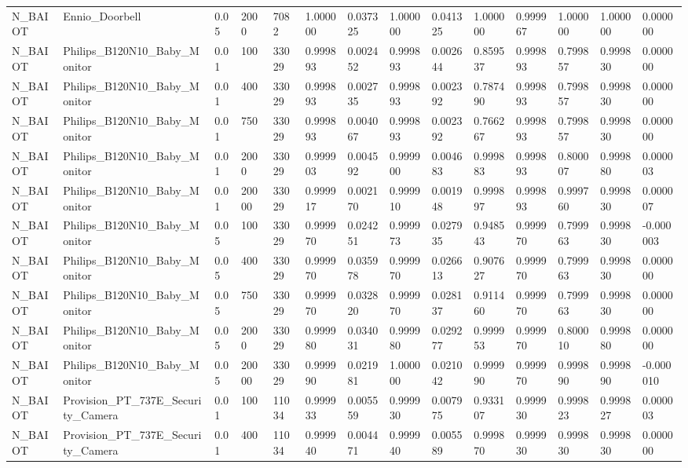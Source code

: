 \begin{tabular}{llllllllllllll}
N\_BAIOT & Ennio\_Doorbell & 0.05 & 2000 & 7082 & 1.000000 & 0.037325 & 1.000000 & 0.041325 & 1.000000 & 0.999967 & 1.000000 & 1.000000 & 0.000000 \\
N\_BAIOT & Philips\_B120N10\_Baby\_Monitor & 0.01 & 100 & 33029 & 0.999893 & 0.002452 & 0.999893 & 0.002644 & 0.859537 & 0.999893 & 0.799857 & 0.999830 & 0.000000 \\
N\_BAIOT & Philips\_B120N10\_Baby\_Monitor & 0.01 & 400 & 33029 & 0.999893 & 0.002735 & 0.999893 & 0.002392 & 0.787490 & 0.999893 & 0.799857 & 0.999830 & 0.000000 \\
N\_BAIOT & Philips\_B120N10\_Baby\_Monitor & 0.01 & 750 & 33029 & 0.999893 & 0.004067 & 0.999893 & 0.002392 & 0.766267 & 0.999893 & 0.799857 & 0.999830 & 0.000000 \\
N\_BAIOT & Philips\_B120N10\_Baby\_Monitor & 0.01 & 2000 & 33029 & 0.999903 & 0.004592 & 0.999900 & 0.004683 & 0.999883 & 0.999893 & 0.800007 & 0.999880 & 0.000003 \\
N\_BAIOT & Philips\_B120N10\_Baby\_Monitor & 0.01 & 20000 & 33029 & 0.999917 & 0.002170 & 0.999910 & 0.001948 & 0.999897 & 0.999893 & 0.999760 & 0.999830 & 0.000007 \\
N\_BAIOT & Philips\_B120N10\_Baby\_Monitor & 0.05 & 100 & 33029 & 0.999970 & 0.024251 & 0.999973 & 0.027935 & 0.948543 & 0.999970 & 0.799963 & 0.999830 & -0.000003 \\
N\_BAIOT & Philips\_B120N10\_Baby\_Monitor & 0.05 & 400 & 33029 & 0.999970 & 0.035978 & 0.999970 & 0.026613 & 0.907627 & 0.999970 & 0.799963 & 0.999830 & 0.000000 \\
N\_BAIOT & Philips\_B120N10\_Baby\_Monitor & 0.05 & 750 & 33029 & 0.999970 & 0.032820 & 0.999970 & 0.028137 & 0.911460 & 0.999970 & 0.799963 & 0.999830 & 0.000000 \\
N\_BAIOT & Philips\_B120N10\_Baby\_Monitor & 0.05 & 2000 & 33029 & 0.999980 & 0.034031 & 0.999980 & 0.029277 & 0.999953 & 0.999970 & 0.800010 & 0.999880 & 0.000000 \\
N\_BAIOT & Philips\_B120N10\_Baby\_Monitor & 0.05 & 20000 & 33029 & 0.999990 & 0.021981 & 1.000000 & 0.021042 & 0.999990 & 0.999970 & 0.999890 & 0.999890 & -0.000010 \\
N\_BAIOT & Provision\_PT\_737E\_Security\_Camera & 0.01 & 100 & 11034 & 0.999933 & 0.005559 & 0.999930 & 0.007975 & 0.933107 & 0.999930 & 0.999823 & 0.999827 & 0.000003 \\
N\_BAIOT & Provision\_PT\_737E\_Security\_Camera & 0.01 & 400 & 11034 & 0.999940 & 0.004471 & 0.999940 & 0.005589 & 0.999870 & 0.999930 & 0.999830 & 0.999830 & 0.000000 \\

\end{tabular}
